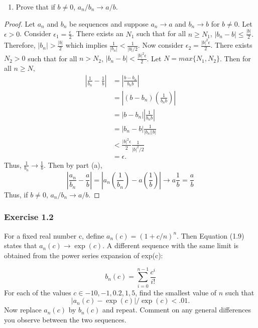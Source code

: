 \documentclass[12pt,]{article}
\providecommand{\tightlist}{%
  \setlength{\itemsep}{0pt}\setlength{\parskip}{0pt}}
\begin{document}
\newpage

\begin{enumerate}
\def\labelenumi{\alph{enumi}.}
\setcounter{enumi}{1}
\tightlist
\item
  Prove that if \(b \ne 0\), \(a_n/b_n \rightarrow a/b.\)
\end{enumerate}

\begin{proof}
Let $a_n$ and $b_n$ be sequences and suppose $a_n \rightarrow a$ and $b_n \rightarrow b$ for $b\ne 0.$ Let $\epsilon >0$. Consider $\epsilon_1 = \frac{\epsilon}{2}$. There exists an $N_1$ such that for all $n \ge N_1$, $|b_n - b| \le \frac{|b|}{2}.$ Therefore, $|b_n|>\frac{|b|}{2}$ which implies $\frac{1}{|b_n|}<\frac{1}{|b|/2}$. Now consider $\epsilon_2 = \frac{|b|^2\epsilon}{2}$. There exists $N_2>0$ such that for all $n>N_2$, $|b_n-b|<\frac{|b|^2\epsilon}{2}$. Let $N = max\{N_1, N_2\}$. Then for all $n\ge N,$
\begin{align*}
\left|\frac{1}{b_n}-\frac{1}{b}\right| & = \left|\frac{b-b_n}{b_nb}\right|\\
&=\left|(b-b_n)\left(\frac{1}{b_nb}\right)\right|\\
&=\left|b-b_n\right|\left|\frac{1}{b_nb}\right|\\
&=\left|b_n-b\right|\frac{1}{|b_n||b|}\\
&<\frac{|b|^2\epsilon}{2}\frac{1}{|b|^2/2}\\
&=\epsilon.
\end{align*}
Thus, $\frac{1}{b_n}\rightarrow \frac{1}{b}$. Then by part (a), 
$$\left| \frac{a_n}{b_n}-\frac{a}{b}\right|=\left|a_n\left(\frac{1}{b_n}\right)-a\left(\frac{1}{b}\right)\right|\rightarrow a\frac{1}{b}=\frac{a}{b}$$
Thus, if $b \ne 0$, $a_n/b_n \rightarrow a/b.$
\end{proof}

\hypertarget{exercise-1.2}{%
\subsubsection{Exercise 1.2}\label{exercise-1.2}}

For a fixed real number c, define \(a_n(c) = (1 + c/n)^n\). Then
Equation (1.9) states that \(a_n(c) \rightarrow \exp(c)\). A different
sequence with the same limit is obtained from the power series expansion
of exp(c):

\[b_n(c)=\sum_{i=0}^{n-1}\frac{c^i}{i!}\] For each of the values
\(c \in {-10,-1,0.2,1,5}\), find the smallest value of \(n\) such that
\[|a_n(c)-\exp(c)|/\exp(c)<.01.\] Now replace \(a_n(c)\) by \(b_n(c)\)
and repeat. Comment on any general differences you observe between the
two sequences.
\end{document}

